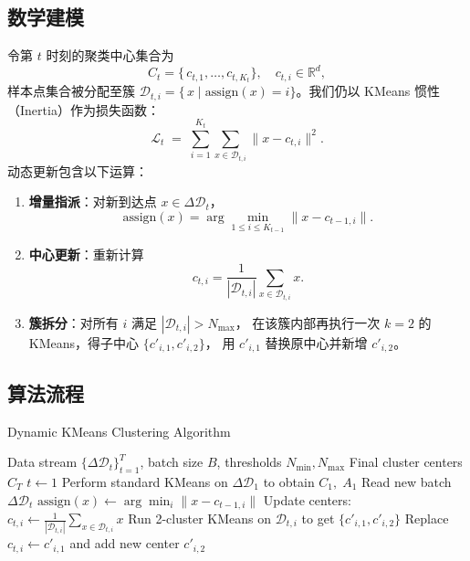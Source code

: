 \documentclass[12pt]{article}  %
\begin{document}
\subsection{数学建模}
令第 $t$ 时刻的聚类中心集合为
\[
C_t=\{\,c_{t,1},\dots,c_{t,K_t}\},\quad c_{t,i}\in\mathbb{R}^d,
\]
样本点集合被分配至簇 $\mathcal{D}_{t,i}=\{\,x\mid \mathrm{assign}(x)=i\}$。我们仍以 KMeans 惯性（Inertia）作为损失函数：
\[
\mathcal{L}_t \;=\;\sum_{i=1}^{K_t}\sum_{x\in\mathcal{D}_{t,i}}\|x - c_{t,i}\|^2.
\]
动态更新包含以下运算：
\begin{enumerate}
  \item \textbf{增量指派}：对新到达点 $x\in\Delta\mathcal{D}_t$，
  \[
    \mathrm{assign}(x)
    =\arg\min_{1\le i\le K_{t-1}}\|x - c_{t-1,i}\|.
  \]
  \item \textbf{中心更新}：重新计算
  \[
    c_{t,i}
    =\frac{1}{|\mathcal{D}_{t,i}|}\sum_{x\in\mathcal{D}_{t,i}} x.
  \]
  \item \textbf{簇拆分}：对所有 $i$ 满足 $|\mathcal{D}_{t,i}|>N_{\max}$，
  在该簇内部再执行一次 $k=2$ 的 KMeans，得子中心 $\{c'_{i,1},c'_{i,2}\}$，
  用 $c'_{i,1}$ 替换原中心并新增 $c'_{i,2}$。
\end{enumerate}

\subsection{算法流程}
\begin{algorithm}[h]
  \caption{Dynamic KMeans Clustering Algorithm}
  \label{alg:dynamic_kmeans}
  \begin{algorithmic}[1]
    \Require Data stream $\{\Delta\mathcal{D}_t\}_{t=1}^T$, batch size $B$, thresholds $N_{\min},N_{\max}$
    \Ensure Final cluster centers $C_T$
    \State $t \gets 1$
    \State Perform standard KMeans on $\Delta\mathcal{D}_1$ to obtain $C_1,\;A_1$
      \State Read new batch $\Delta\mathcal{D}_t$
        \State $\mathrm{assign}(x)\gets\arg\min_{i}\|x - c_{t-1,i}\|$
      \EndFor
      \State Update centers: $c_{t,i}\gets\frac{1}{|\mathcal{D}_{t,i}|}\sum_{x\in\mathcal{D}_{t,i}}x$
        \State Run 2-cluster KMeans on $\mathcal{D}_{t,i}$ to get $\{c'_{i,1},c'_{i,2}\}$
        \State Replace $c_{t,i}\gets c'_{i,1}$ and add new center $c'_{i,2}$
      \EndFor
    \EndFor
  \end{algorithmic}
\end{algorithm}
\end{document}
